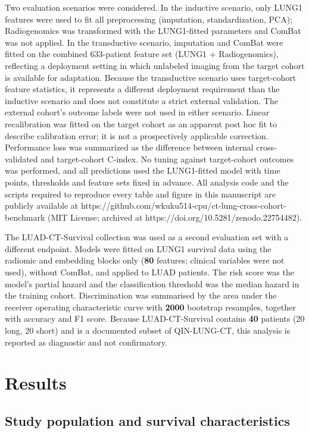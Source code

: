 \documentclass[a4paper,fleqn]{cas-sc}
\begin{document}
Two evaluation scenarios were considered. In the inductive scenario, only LUNG1 features were used to fit all preprocessing (imputation, standardization, PCA); Radiogenomics was transformed with the LUNG1-fitted parameters and ComBat was not applied. In the transductive scenario, imputation and ComBat were fitted on the combined 633-patient feature set (LUNG1 + Radiogenomics), reflecting a deployment setting in which unlabeled imaging from the target cohort is available for adaptation. Because the transductive scenario uses target-cohort feature statistics, it represents a different deployment requirement than the inductive scenario and does not constitute a strict external validation. The external cohort's outcome labels were not used in either scenario. Linear recalibration was fitted on the target cohort as an apparent post hoc fit to describe calibration error; it is not a prospectively applicable correction. Performance loss was summarized as the difference between internal cross-validated and target-cohort C-index. No tuning against target-cohort outcomes was performed, and all predictions used the LUNG1-fitted model with time points, thresholds and feature sets fixed in advance. All analysis code and the scripts required to reproduce every table and figure in this manuscript are publicly available at https://github.com/wkuku514-cpu/ct-lung-cross-cohort-benchmark (MIT License; archived at https://doi.org/10.5281/zenodo.22754482).

The LUAD-CT-Survival collection was used as a second evaluation set with a different endpoint. Models were fitted on LUNG1 survival data using the radiomic and embedding blocks only (\textbf{80} features; clinical variables were not used), without ComBat, and applied to LUAD patients. The risk score was the model's partial hazard and the classification threshold was the median hazard in the training cohort. Discrimination was summarised by the area under the receiver operating characteristic curve with \textbf{2000} bootstrap resamples, together with accuracy and F1 score. Because LUAD-CT-Survival contains \textbf{40} patients (20 long, 20 short) and is a documented subset of QIN-LUNG-CT, this analysis is reported as diagnostic and not confirmatory.

\section{Results}

\subsection{Study population and survival characteristics}
\end{document}
